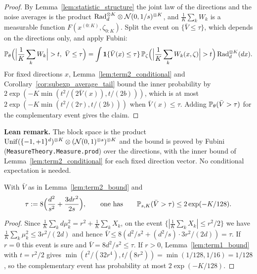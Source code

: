 \begin{proof}
\leanok
{}
By Lemma~\ref{lem:statistic_structure} the joint law of the directions and the noise
averages is the product $\mathrm{Rad}_d^{\otimes K} \otimes \mathcal{N}(0,1/s)^{\otimes K}$, and
$\frac1K\sum_k W_k$ is a measurable function $F(x^{(0:K)}, \zeta_{0:K})$. Split the event on
$\{\bar V \le \tau\}$, which depends on the directions only, and apply Fubini:
\[
  \mathbb{P}_\theta\Big(\Big|\frac1K\sum_k W_k\Big| > t,\ \bar V \le \tau\Big)
  = \int \mathbf{1}\{\bar V(x) \le \tau\}\,
    \mathbb{P}_\zeta\Big( \Big| \frac1K\sum_k W_k(x, \zeta) \Big| > t \Big)\,
    \mathrm{Rad}_d^{\otimes K}(dx) .
\]
For fixed directions $x$, Lemma~\ref{lem:term2_conditional} and
Corollary~\ref{cor:subexp_average_tail} bound the inner probability by
$2\exp(-K\min(t^2/(2\bar V(x)), t/(2b)))$, which is at most
$2\exp(-K\min(t^2/(2\tau), t/(2b)))$ when $\bar V(x) \le \tau$. Adding
$\mathbb{P}_\theta(\bar V > \tau)$ for the complementary event gives the claim.
\end{proof}

\textbf{Lean remark.} The block space is the product
$\mathrm{Unif}(\{-1,+1\}^d)^{\otimes K} \otimes (\mathcal{N}(0,1)^{\otimes s})^{\otimes K}$ and the
bound is proved by Fubini (\texttt{MeasureTheory.Measure.prod}) over the directions, with
the inner bound of Lemma~\ref{lem:term2_conditional} for each fixed direction vector. No
conditional expectation is needed.

\begin{lemma}\label{lem:vbar_bound}
\leanok
{}
With $\bar V$ as in Lemma~\ref{lem:term2_bound} and
\[
  \tau := 8\Big( \frac{d^2}{s^2} + \frac{3 d r^2}{2 s} \Big),
  \qquad\text{one has}\qquad
  \mathbb{P}_{s,K}(\bar V > \tau) \le 2\exp(-K/128) .
\]
\end{lemma}

\begin{proof}
\leanok
{}
Since $\frac1K\sum_k d\mu_k^2 = r^2 + \frac1K\sum_k X_k$, on the event
$\{|\frac1K\sum_k X_k| \le r^2/2\}$ we have $\frac1K\sum_k\mu_k^2 \le 3r^2/(2d)$ and hence
$\bar V \le 8(d^2/s^2 + (d^2/s)\cdot 3r^2/(2d)) = \tau$. If $r = 0$ this event is sure and
$\bar V = 8d^2/s^2 \le \tau$. If $r > 0$, Lemma~\ref{lem:term1_bound} with $t = r^2/2$ gives
$\min(t^2/(32r^4), t/(8r^2)) = \min(1/128, 1/16) = 1/128$, so the complementary event has
probability at most $2\exp(-K/128)$.
\end{proof}

